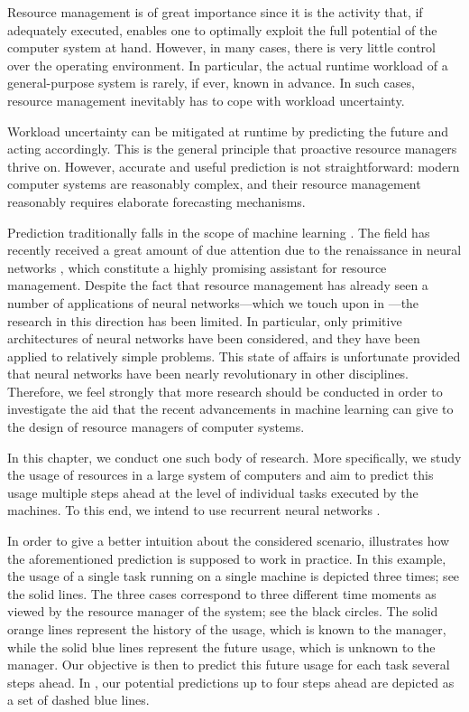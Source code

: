 Resource management is of great importance since it is the activity that, if
adequately executed, enables one to optimally exploit the full potential of the
computer system at hand. However, in many cases, there is very little control
over the operating environment. In particular, the actual runtime workload of a
general-purpose system is rarely, if ever, known in advance. In such cases,
resource management inevitably has to cope with workload uncertainty.

Workload uncertainty can be mitigated at runtime by predicting the future and
acting accordingly. This is the general principle that proactive resource
managers thrive on. However, accurate and useful prediction is not
straightforward: modern computer systems are reasonably complex, and their
resource management reasonably requires elaborate forecasting mechanisms.

Prediction traditionally falls in the scope of machine learning
\cite{hastie2013}. The field has recently received a great amount of due
attention due to the renaissance in neural networks \cite{goodfellow2016}, which
constitute a highly promising assistant for resource management. Despite the
fact that resource management has already seen a number of applications of
neural networks---which we touch upon in ---the research in
this direction has been limited. In particular, only primitive architectures of
neural networks have been considered, and they have been applied to relatively
simple problems. This state of affairs is unfortunate provided that neural
networks have been nearly revolutionary in other disciplines. Therefore, we feel
strongly that more research should be conducted in order to investigate the aid
that the recent advancements in machine learning can give to the design of
resource managers of computer systems.

In this chapter, we conduct one such body of research. More specifically, we
study the usage of resources in a large system of computers and aim to predict
this usage multiple steps ahead at the level of individual tasks executed by the
machines. To this end, we intend to use recurrent neural networks
\cite{goodfellow2016}.

In order to give a better intuition about the considered scenario,
 illustrates how the aforementioned prediction is
supposed to work in practice. In this example, the  usage of a single
task running on a single machine is depicted three times; see the solid lines.
The three cases correspond to three different time moments as viewed by the
resource manager of the system; see the black circles. The solid orange lines
represent the history of the usage, which is known to the manager, while the
solid blue lines represent the future usage, which is unknown to the manager.
Our objective is then to predict this future usage for each task several steps
ahead. In , our potential predictions up to four steps
ahead are depicted as a set of dashed blue lines.

